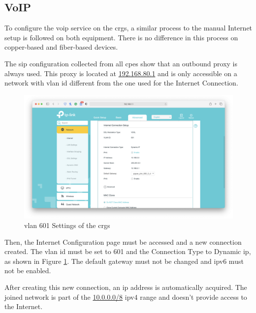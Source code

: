 \subsection{VoIP}

To configure the \gls{voip} service on the \gls{crg}s, a similar process to the manual Internet setup is followed on both equipment. There is no difference in this process on copper-based and fiber-based devices.

The \gls{sip} configuration collected from all \glspl{cpe} show that an outbound proxy is always used. This proxy is located at \url{192.168.80.1} and is only accessible on a network with \gls{vlan} \gls{id} different from the one used for the Internet Connection.

\begin{figure}[h]
    \centering
    \includegraphics[width=\linewidth]{contents/substituting-the-isp-cpe/voip/advanced-network-internet-vlan601.png}
    \caption{\gls{vlan} 601 Settings of the \gls{crg}s}
    \label{figure:crgs_vlan601}
\end{figure}

Then, the Internet Configuration page must be accessed and a new connection created. The \gls{vlan} \gls{id} must be set to 601 and the Connection Type to Dynamic \gls{ip}, as shown in Figure \ref{figure:crgs_vlan601}. The default gateway must not be changed and \gls{ip}v6 must not be enabled.

After creating this new connection, an \gls{ip} address is automatically acquired. The joined network is part of the \url{10.0.0.0/8} \gls{ip}v4 range and doesn’t provide access to the Internet.

